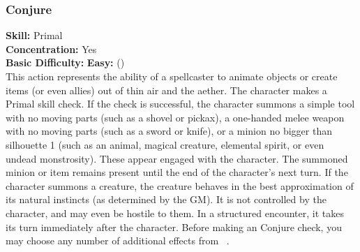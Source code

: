 \subsubsection{Conjure}
\textbf{Skill:} Primal\\
\textbf{Concentration:} Yes\\
\textbf{Basic Difficulty:} \textbf{Easy:} (\difficulty)\\
This action represents the ability of a spellcaster to animate objects or create
items (or even allies) out of thin air and the aether. The character makes a Primal
skill check. If the check is successful, the character summons a simple tool with
no moving parts (such as a shovel or pickax), a one-handed melee weapon with no moving
parts (such as a sword or knife), or a minion no bigger than silhouette 1 (such as an
animal, magical creature, elemental spirit, or even undead monstrosity). These appear
engaged with the character. The summoned minion or item remains present until the end
of the character's next turn. If the character summons a creature, the creature behaves
in the best approximation of its natural instincts (as determined by the GM). It
is not controlled by the character, and may even be hostile to them. In a structured
encounter, it takes its turn immediately after the character. Before making an
Conjure check, you may choose any number of additional effects from
~.
